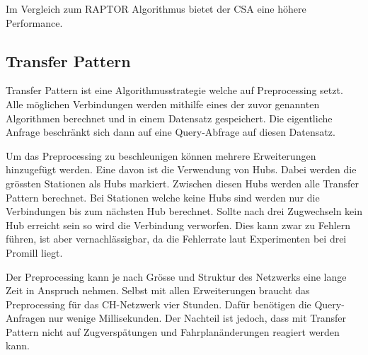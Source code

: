 Im Vergleich zum RAPTOR Algorithmus bietet der CSA eine höhere Performance.


\subsection{Transfer Pattern}
\label{subsec:Transfer Pattern}
Transfer Pattern ist eine Algorithmusstrategie welche auf Preprocessing setzt. Alle möglichen Verbindungen werden mithilfe eines der zuvor genannten Algorithmen berechnet und in einem Datensatz gespeichert. Die eigentliche Anfrage beschränkt sich dann auf eine Query-Abfrage auf diesen Datensatz. \vspace{0.5cm}

Um das Preprocessing zu beschleunigen können mehrere Erweiterungen hinzugefügt werden. Eine davon ist die Verwendung von Hubs. Dabei werden die grössten Stationen als Hubs markiert. Zwischen diesen Hubs werden alle Transfer Pattern berechnet. Bei Stationen welche keine Hubs sind werden nur die Verbindungen bis zum nächsten Hub berechnet. Sollte nach drei Zugwechseln kein Hub erreicht sein so wird die Verbindung verworfen. Dies kann zwar zu Fehlern führen, ist aber vernachlässigbar, da die Fehlerrate laut Experimenten bei drei Promill liegt. \vspace{0.5cm}

Der Preprocessing kann je nach Grösse und Struktur des Netzwerks eine lange Zeit in Anspruch nehmen. Selbst mit allen Erweiterungen braucht das Preprocessing für das CH-Netzwerk vier Stunden. Dafür benötigen die Query-Anfragen nur wenige Millisekunden. Der Nachteil ist jedoch, dass mit Transfer Pattern nicht auf Zugverspätungen und Fahrplanänderungen reagiert werden kann. 



